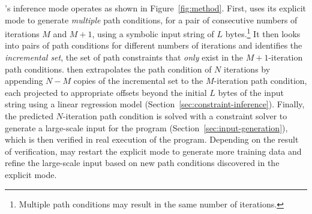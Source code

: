 \lancet's inference mode operates as shown in Figure~\ref{fig:method}.
First, \lancet uses its explicit mode to generate {\em multiple} path conditions, for a pair of consecutive numbers of iterations $M$ and $M+1$, using a symbolic input string of $L$ bytes.\footnote{Multiple path conditions may result in the same number of iterations.}
It then looks into pairs of path conditions for different numbers of iterations and identifies the {\em incremental set}, the set of path constraints that {\em only} exist in the $M+1$-iteration path conditions.
\lancet then extrapolates the path condition of $N$ iterations by appending $N-M$ copies of the incremental set to the $M$-iteration path condition, each projected to appropriate offsets beyond the initial $L$ bytes of the input string using a linear regression model (Section~\ref{sec:constraint-inference}).
Finally, the predicted $N$-iteration path condition is solved with a constraint solver to generate a large-scale input for the program (Section~\ref{sec:input-generation}), which is then verified in real execution of the program. Depending on the result of verification, \lancet may restart the explicit mode to generate more training data and refine the large-scale input based on new path conditions discovered in the explicit mode.


